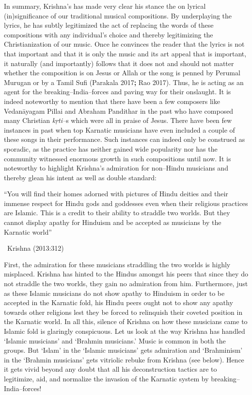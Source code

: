In summary, Krishna’s has made very clear his stance the on lyrical (in)significance of our traditional musical compositions. By underplaying the lyrics, he has subtly legitimized the act of replacing the words of these compositions with any individual’s choice and thereby legitimizing the Christianization of our music. Once he convinces the reader that the lyrics is not that important and that it is only the music and its art appeal that is important, it naturally (and importantly) follows that it does not and should not matter whether the composition is on Jesus or Allah or the song is penned by Perumal Murugan or by a Tamil Sufi (Parakala 2017\textbf{; }Rao 2017). Thus, he is acting as an agent for the breaking–India–forces and paving way for their onslaught. It is indeed noteworthy to mention that there have been a few composers like Vedanāyagam Pillai and Abraham Pandithar in the past who have composed many Christian \textit{kṛti–}s which were all in praise of Jesus. There have been few instances in past when top Karnatic musicians have even included a couple of these songs in their performance. Such instances can indeed only be construed as sporadic, as the practice has neither gained wide popularity nor has the community witnessed enormous growth in such compositions until now. It is noteworthy to highlight Krishna’s admiration for non–Hindu musicians and thereby glean his intent as well as double standard:

\begin{myquote}
“You will find their homes adorned with pictures of Hindu deities and their immense respect for Hindu gods and goddesses even when their religious practices are Islamic. This is a credit to their ability to straddle two worlds. But they cannot display apathy for Hinduism and be accepted as musicians by the Karnatic world” 

~\hfill Krishna (2013:312)
\end{myquote}

First, the admiration for these musicians straddling the two worlds is highly misplaced. Krishna has hinted to the Hindus amongst his peers that since they do not straddle the two worlds, they gain no admiration from him. Furthermore, just as these Islamic musicians do not show apathy to Hinduism in order to be accepted in the Karnatic fold, his Hindu peers ought not to show any apathy towards other religions lest they be forced to relinquish their coveted position in the Karnatic world. In all this, silence of Krishna on how these musicians came to Islamic fold is glaringly conspicuous. Let us look at the way Krishna has handled ‘Islamic musicians’ and ‘Brahmin musicians.’ Music is common in both the groups. But ‘Islam’ in the ‘Islamic musicians’ gets admiration and ‘Brahminism’ in the ‘Brahmin musicians’ gets vitriolic rebuke from Krishna (see below). Hence it gets vivid beyond any doubt that all his deconstruction tactics are to legitimize, aid, and normalize the invasion of the Karnatic system by breaking–India–forces!

